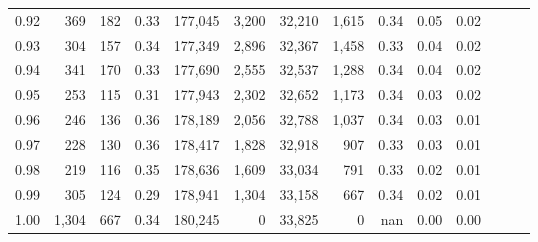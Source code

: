 \begin{tabular}{rrrrrrrrrrrrrr}
0.92 &    369 &  182 &  0.33 &  177,045 &    3,200 &  32,210 &   1,615 &  0.34 &  0.05 &      0.02 \\
0.93 &    304 &  157 &  0.34 &  177,349 &    2,896 &  32,367 &   1,458 &  0.33 &  0.04 &      0.02 \\
0.94 &    341 &  170 &  0.33 &  177,690 &    2,555 &  32,537 &   1,288 &  0.34 &  0.04 &      0.02 \\
0.95 &    253 &  115 &  0.31 &  177,943 &    2,302 &  32,652 &   1,173 &  0.34 &  0.03 &      0.02 \\
0.96 &    246 &  136 &  0.36 &  178,189 &    2,056 &  32,788 &   1,037 &  0.34 &  0.03 &      0.01 \\
0.97 &    228 &  130 &  0.36 &  178,417 &    1,828 &  32,918 &     907 &  0.33 &  0.03 &      0.01 \\
0.98 &    219 &  116 &  0.35 &  178,636 &    1,609 &  33,034 &     791 &  0.33 &  0.02 &      0.01 \\
0.99 &    305 &  124 &  0.29 &  178,941 &    1,304 &  33,158 &     667 &  0.34 &  0.02 &      0.01 \\
1.00 &  1,304 &  667 &  0.34 &  180,245 &        0 &  33,825 &       0 &   nan &  0.00 &      0.00 \\
\bottomrule
\end{tabular}
